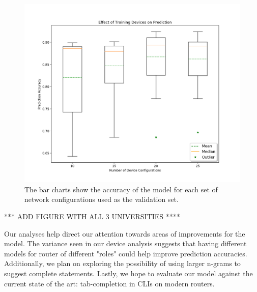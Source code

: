 \begin{figure}
	\centering
	\includegraphics[width=\columnwidth]{umn_analysis.png}
	\caption{The bar charts show the accuracy of the model for each set of network configurations used as the validation set.}
    \label{fig:umn_analysis}
\end{figure}

*** ADD FIGURE WITH ALL 3 UNIVERSITIES ****

Our analyses help direct our attention towards areas of improvements for the model. The variance seen in our device analysis suggests that having different models for router of different "roles" could help improve prediction accuracies. Additionally, we plan on exploring the possibility of using larger n-grams to suggest complete statements. Lastly, we hope to evaluate our model against the current state of the art: tab-completion in CLIs on modern routers.
 
